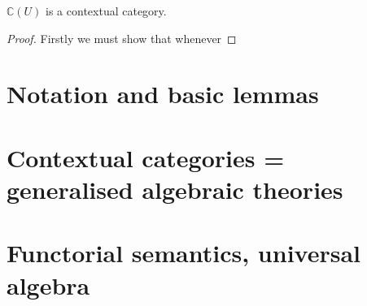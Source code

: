 \begin{lemma}
  \(\mathbb C (U)\) is a contextual category.
\end{lemma}
%
%

\begin{proof}
  Firstly we must show that whenever
\end{proof}











\lipsum[15]

\section{Notation and basic lemmas} \label{sec:source-2-3}

\lipsum[16]

\section{Contextual categories = generalised algebraic theories} \label{sec:source-2-4}

\lipsum[17]

\section{Functorial semantics, universal algebra} \label{sec:source-2-5}

\lipsum[18]

